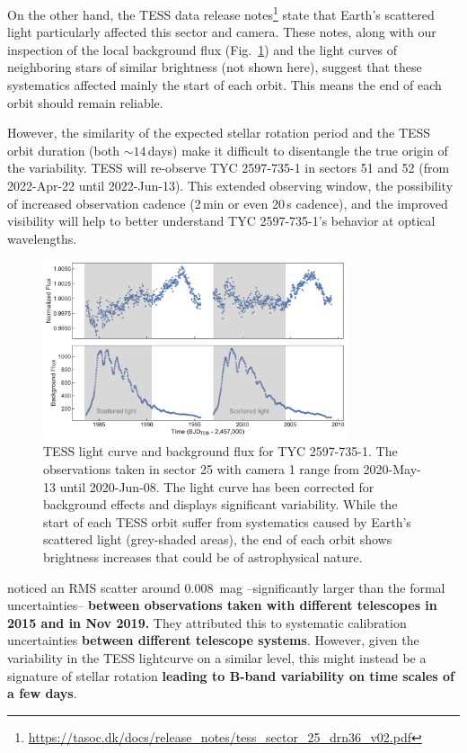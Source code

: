 \documentclass[linenumbers]{aastex631}
\begin{document}
On the other hand, the TESS data release notes\footnote{\url{https://tasoc.dk/docs/release_notes/tess_sector_25_drn36_v02.pdf}} state that Earth's scattered light particularly affected this sector and camera. These notes, along with our inspection of the local background flux (Fig.~\ref{fig:TESS_light_curve}) and the light curves of neighboring stars of similar brightness (not shown here), suggest that these systematics affected mainly the start of each orbit. This means the end of each orbit should remain reliable.

However, the similarity of the expected stellar rotation period and the TESS orbit duration (both $\sim14$\,days) make it difficult to disentangle the true origin of the variability. TESS will re-observe TYC 2597-735-1 in sectors 51 and 52 (from 2022-Apr-22 until 2022-Jun-13). This extended observing window, the possibility of increased observation cadence (2\,min or even 20\,s cadence), and the improved visibility will help to better understand TYC 2597-735-1's behavior at optical wavelengths.

\begin{figure}
    \centering
    \includegraphics[width=0.8\textwidth]{figures/TESS_light_curve.pdf}
    \caption{TESS light curve and background flux for TYC 2597-735-1. The observations taken in sector 25 with camera 1 range from 2020-May-13 until 2020-Jun-08. The light curve has been corrected for background effects and displays significant variability. While the start of each TESS orbit suffer from systematics caused by Earth's scattered light (grey-shaded areas), the end of each orbit shows brightness increases that could be of astrophysical nature.
    \label{fig:TESS_light_curve}}
\end{figure}

\cite{2020Natur.587..387H} noticed an RMS scatter around 0.008~mag --significantly larger than the formal uncertainties-- 
\textbf{between observations taken with different telescopes in 2015 and in Nov 2019.}
They attributed this to systematic calibration uncertainties \textbf{between different telescope systems}. However, given the variability in the TESS lightcurve on a similar level, this might instead be a signature of stellar rotation \textbf{leading to B-band variability on time scales of a few days}.
\end{document}

